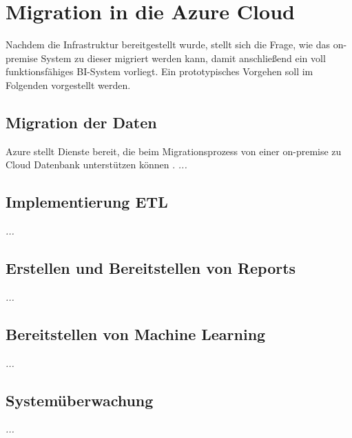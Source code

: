 \section{Migration in die Azure Cloud} \label{sec:praktischeUmsetzung:Migration}
Nachdem die Infrastruktur bereitgestellt wurde, stellt sich die Frage, wie das on-premise System zu dieser migriert werden kann, damit anschließend ein voll funktionsfähiges BI-System vorliegt. Ein prototypisches Vorgehen soll im Folgenden vorgestellt werden.

\subsection{Migration der Daten}
Azure stellt Dienste bereit, die beim Migrationsprozess von einer on-premise zu Cloud Datenbank unterstützen können \cite{chilberto_building_2020}. 
\textit{...}

\subsection{Implementierung ETL}
\textit{...}

\subsection{Erstellen und Bereitstellen von Reports}
\textit{...}

\subsection{Bereitstellen von Machine Learning}
\textit{...}

\subsection{Systemüberwachung}
\textit{...}